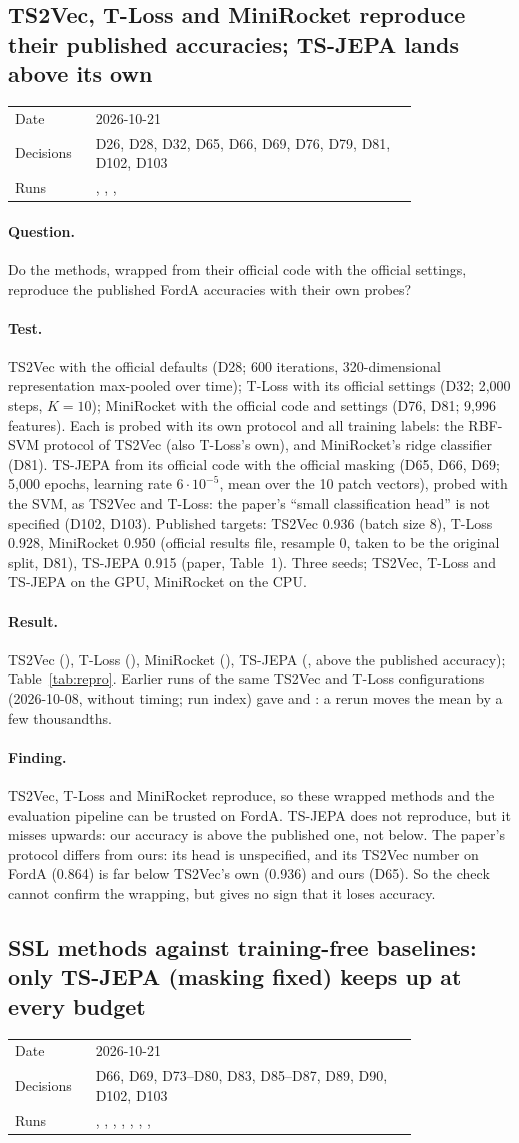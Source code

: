 \documentclass[11pt,a4paper]{article}
\makeatletter
\newcommand{\entry}[5]{%
  \subsection{#2}\label{#1}
  \begin{tabular}{@{}>{\footnotesize\color{muted}}l>{\footnotesize}p{0.8\linewidth}@{}}
    Date & #3 \\ Decisions & #4 \\ Runs & #5
  \end{tabular}\par}
\newcommand{\question}{\paragraph{Question.}}
\newcommand{\test}{\paragraph{Test.}}
\newcommand{\result}{\paragraph{Result.}}
\newcommand{\finding}{\paragraph{Finding.}}
\newcommand{\run}[1]{\texttt{\detokenize{#1}}}
\makeatother
\begin{document}
\entry{forda-repro}{TS2Vec, T-Loss and MiniRocket reproduce their published accuracies; TS-JEPA lands above its own}{2026-10-21}
  {D26, D28, D32, D65, D66, D69, D76, D79, D81, D102, D103}{\run{20261020_144711_ts2vec_forda}, \run{20261020_144932_tloss_forda},
  \run{20261020_152809_minirocket_forda}, \run{20261016_114600_tsjepa_forda}}

\question
Do the methods, wrapped from their official code with the official settings, reproduce the
published FordA accuracies with their own probes?

\test
TS2Vec with the official defaults (D28; 600 iterations, 320-dimensional representation
max-pooled over time); T-Loss with its official settings (D32; 2,000 steps, $K = 10$);
MiniRocket with the official code and settings (D76, D81; 9,996 features). Each is probed with
its own protocol and all training labels: the RBF-SVM protocol of TS2Vec (also T-Loss's own),
and MiniRocket's ridge classifier (D81). TS-JEPA from its official code with the official
masking (D65, D66, D69; 5,000 epochs, learning rate $6 \cdot 10^{-5}$, mean over the 10 patch
vectors), probed with the SVM, as TS2Vec and T-Loss: the paper's ``small classification head''
is not specified (D102, D103). Published targets: TS2Vec 0.936 (batch size 8), T-Loss 0.928,
MiniRocket 0.950 (official results file, resample 0, taken to be the original split, D81),
TS-JEPA 0.915 (paper, Table~1). Three seeds; TS2Vec, T-Loss and TS-JEPA on the GPU, MiniRocket
on the CPU.

\result
TS2Vec \TsvecAcc{} (\TsvecVerdict), T-Loss \TlossAcc{} (\TlossVerdict), MiniRocket
\MinirocketAcc{} (\MinirocketVerdict), TS-JEPA \TsjepaAcc{} (\TsjepaVerdict, above the
published accuracy); Table~\ref{tab:repro}. Earlier runs of the same
TS2Vec and T-Loss configurations (2026-10-08, without timing; run index) gave
\FordaTsvecEarlier{} and \FordaTlossEarlier: a rerun moves the mean by a few thousandths.

\finding
TS2Vec, T-Loss and MiniRocket reproduce, so these wrapped methods and the evaluation pipeline
can be trusted on FordA. TS-JEPA does not reproduce, but it misses upwards: our accuracy is above the
published one, not below. The paper's protocol differs from ours: its head is unspecified, and its
TS2Vec number on FordA (0.864) is far below TS2Vec's own (0.936) and ours (D65). So the check
cannot confirm the wrapping, but gives no sign that it loses accuracy.

\entry{forda-baselines}{SSL methods against training-free baselines: only TS-JEPA (masking fixed) keeps up at every budget}{2026-10-21}
  {D66, D69, D73--D80, D83, D85--D87, D89, D90, D102, D103}{\run{20261020_143928_raw_forda}, \run{20261020_144122_fft_forda},
  \run{20261020_144235_catch22_forda}, \run{20261020_152809_minirocket_forda},
  \run{20261020_144711_ts2vec_forda}, \run{20261020_144932_tloss_forda},
  \run{20261016_114616_tsjepa_forda_fixed}, \run{20261019_154248_patchtst_forda_mean}}
\end{document}
